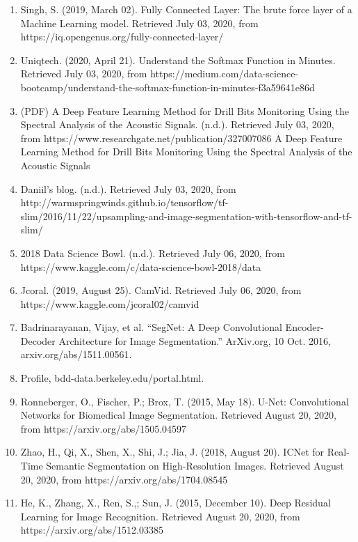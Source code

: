 \documentclass{IEEEtran}
\begin{document}
\begin{enumerate}
\item Singh, S. (2019, March 02). Fully Connected Layer: The brute force layer of a Machine Learning model. Retrieved July 03, 2020, from https://iq.opengenus.org/fully-connected-layer/

\item Uniqtech. (2020, April 21). Understand the Softmax Function in Minutes. Retrieved July 03, 2020, from https://medium.com/data-science-bootcamp/understand-the-softmax-function-in-minutes-f3a59641e86d

\item (PDF) A Deep Feature Learning Method for Drill Bits Monitoring Using the Spectral Analysis of the Acoustic Signals. (n.d.). Retrieved July 03, 2020, from https://www.researchgate.net/publication/327007086 A Deep Feature Learning Method for Drill Bits Monitoring Using the Spectral Analysis of the Acoustic Signals

\item Daniil's blog. (n.d.). Retrieved July 03, 2020, from http://warmspringwinds.github.io/tensorflow/tf-slim/2016/11/22/upsampling-and-image-segmentation-with-tensorflow-and-tf-slim/

\item 2018 Data Science Bowl. (n.d.). Retrieved July 06, 2020, from https://www.kaggle.com/c/data-science-bowl-2018/data

\item Jcoral. (2019, August 25). CamVid. Retrieved July 06, 2020, from https://www.kaggle.com/jcoral02/camvid

\item Badrinarayanan, Vijay, et al. “SegNet: A Deep Convolutional Encoder-Decoder Architecture for Image Segmentation.” ArXiv.org, 10 Oct. 2016, arxiv.org/abs/1511.00561.

\item Profile, bdd-data.berkeley.edu/portal.html.

\item Ronneberger, O., Fischer, P.; Brox, T. (2015, May 18). U-Net: Convolutional Networks for Biomedical Image Segmentation. Retrieved August 20, 2020, from https://arxiv.org/abs/1505.04597

\item Zhao, H., Qi, X., Shen, X., Shi, J.; Jia, J. (2018, August 20). ICNet for Real-Time Semantic Segmentation on High-Resolution Images. Retrieved August 20, 2020, from https://arxiv.org/abs/1704.08545

\item He, K., Zhang, X., Ren, S.,; Sun, J. (2015, December 10). Deep Residual Learning for Image Recognition. Retrieved August 20, 2020, from https://arxiv.org/abs/1512.03385
\end{enumerate}
\end{document}
